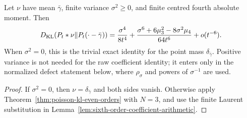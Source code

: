 \begin{theorem}%
\label{thm:poisson-kl-sixth-coefficient}
Let \(\nu\) have mean \(\bar{\gamma}\), finite variance
\(\sigma^2\ge0\), and finite centred fourth absolute moment.  Then
\[
D_{\rm KL}(P_t*\nu\|P_t(\cdot-\bar{\gamma}))
=\frac{\sigma^4}{8t^4}
+\frac{\sigma^6+6\mu_3^2-8\sigma^2\mu_4}{64t^6}
+o(t^{-6}).
\]
When \(\sigma^2=0\), this is the trivial exact identity for the point mass
\(\delta_{\bar{\gamma}}\).  Positive variance is not needed for the raw
coefficient identity; it enters only in the normalized defect statement
below, where \(\rho_\sigma\) and powers of \(\sigma^{-1}\) are used.
\end{theorem}

\begin{proof}
If \(\sigma^2=0\), then \(\nu=\delta_{\bar{\gamma}}\) and both sides vanish.
Otherwise apply Theorem~\ref{thm:poisson-kl-even-orders} with \(N=3\), and
use the finite Laurent substitution in
Lemma~\ref{lem:sixth-order-coefficient-arithmetic}.
\end{proof}
